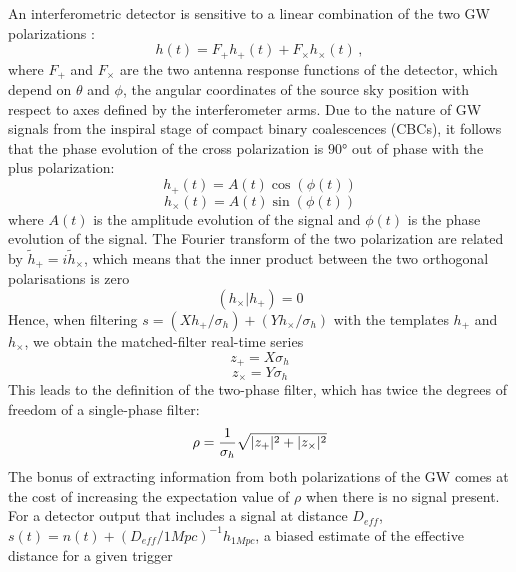 \documentclass[binding=0.6cm, LaM]{sapthesis}
\begin{document}
	An interferometric detector is sensitive to a linear combination 
	of the two GW polarizations \cite{26}: 
                \begin{equation}
                h(t) = F_{+}h_{+} (t) + F_{\times}h_{\times}(t)\,,
                \end{equation}
	where $F_{+}$ and $F_{\times}$ are the two antenna response functions of the detector, 
	which depend on $\theta$ and $\phi$, 
	the angular coordinates of the source sky position with respect to axes defined by the interferometer arms. 
	Due to the nature of GW signals from the inspiral stage of compact binary coalescences (CBCs), 
	it follows that the phase evolution of the cross polarization is $\ang{90}$ out of phase with the plus polarization:
		\begin{equation}
			h_{+}(t) = A(t) \cos (\phi (t))
		\end{equation}
		\begin{equation}
			h_{\times}(t) = A(t) \sin (\phi (t))  
		\end{equation}
	where $A(t)$ is the amplitude evolution of the signal 
	and $\phi(t)$ is the phase evolution of the signal. 
	The Fourier transform of the two polarization are related by $\tilde h_{+} = i\tilde{h}_{\times}$, 
	which means that the inner product between the two orthogonal polarisations is zero 
		\begin{equation}
			(h_{\times}|h_{+}) = 0
		\end{equation}
	Hence, when filtering  $s = (Xh_{+}/\sigma_{h}) + (Y h_{\times}/\sigma_{h})$ 
	with the templates $h_{+}$ and $h_{\times}$, we obtain the matched-filter real-time series
		\begin{equation}
			z_{+} = X\sigma_{h}
		\end{equation}
		\begin{equation}
			z_{\times} = Y \sigma_{h} 
		\end{equation}
	This leads to the definition of the two-phase filter, 
	which has twice the degrees of freedom of a single-phase filter:
		\begin{equation}
			\rho = {1 \over \sigma_h} \sqrt{|z_{+}| ^2+ |z_{\times}|^2}
		\end{equation}
	The bonus of extracting information from both polarizations of the GW 
	comes at the cost of increasing the expectation value of $\rho$ when there is no signal present. 
	For a detector output that includes a signal at distance $D_{eff}$, 
	$s(t) = n(t) + (D_{eff}/1 Mpc)^{-1}h_{1Mpc}$, 
	a biased estimate of the effective distance for a given trigger 
\end{document}
